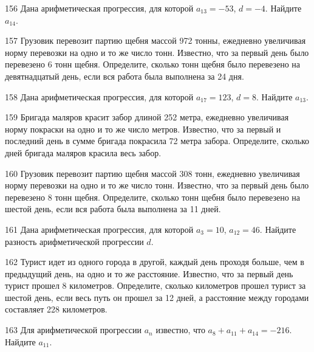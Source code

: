 \documentclass[4apaper]{article}
\begin{document}
\begin{taskBN}{156}
Дана арифметическая прогрессия, для которой $a_{13} = -53$, $d=-4$. Найдите $a_{14}$.
\end{taskBN}

\begin{taskBN}{157}
Грузовик перевозит партию щебня массой 972 тонны, ежедневно увеличивая норму перевозки на одно и то же число тонн. Известно, что за первый день было перевезено 6 тонн щебня. Определите, сколько тонн щебня было перевезено на девятнадцатый день, если вся работа была выполнена за 24 дня.
\end{taskBN}

\begin{taskBN}{158}
Дана арифметическая прогрессия, для которой $a_{17} = 123$, $d=8$. Найдите $a_{13}$.
\end{taskBN}

\begin{taskBN}{159}
 Бригада маляров красит забор длиной 252 метра, ежедневно увеличивая норму покраски на одно и то же число метров. Известно, что за первый и последний день в сумме бригада покрасила 72 метра забора.  Определите, сколько дней бригада маляров красила весь забор. 
\end{taskBN}

\begin{taskBN}{160}
Грузовик перевозит партию щебня массой 308 тонн, ежедневно увеличивая норму перевозки на одно и то же число тонн. Известно, что за первый день было перевезено 8 тонн щебня. Определите, сколько тонн щебня было перевезено на шестой день, если вся работа была выполнена за 11 дней.
\end{taskBN}

\begin{taskBN}{161}
Дана арифметическая прогрессия, для которой $a_{3} = 10$, $a_{12} = 46$. Найдите разность арифметической прогрессии $d$.
\end{taskBN}

\begin{taskBN}{162}
Турист идет из одного города в другой, каждый день проходя больше, чем в предыдущий день, на одно и то же расстояние. Известно, что за первый день турист прошел 8 километров. Определите, сколько километров прошел турист за шестой день, если весь путь он прошел за 12 дней, а расстояние между городами составляет 228 километров.
\end{taskBN}

\begin{taskBN}{163}
Для арифметической прогрессии ${a_n}$ известно, что $a_{8} + a_{11} + a_{14}= -216$. Найдите $a_{11}$.
\end{taskBN}
\end{document}
